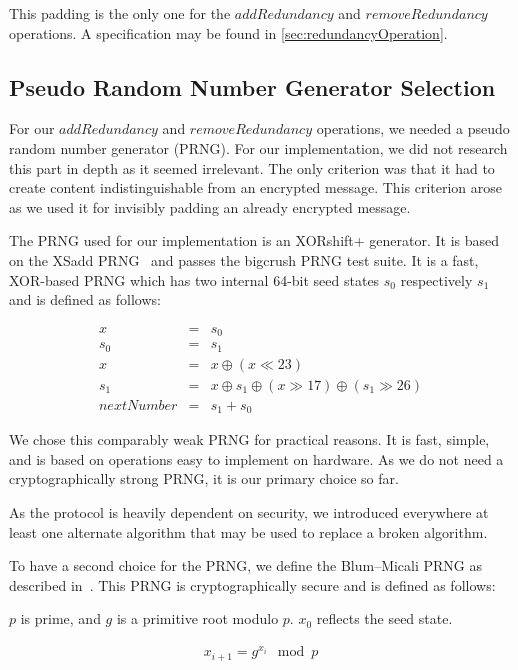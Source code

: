 This padding is the only one for the $addRedundancy$ and $removeRedundancy$ operations. A specification may be found in \cref{sec:redundancyOperation}.

\subsection{Pseudo Random Number Generator Selection}\label{sec:prng}
For our $addRedundancy$ and $removeRedundancy$ operations, we needed a pseudo random number generator (PRNG). For our implementation, we did not research this part in depth as it seemed irrelevant. The only criterion was that it had to create content indistinguishable from an encrypted message. This criterion arose as we used it for invisibly padding an already encrypted message.

The PRNG used for our implementation is an XORshift+ generator. It is based on the XSadd PRNG~\cite{marsaglia2003xorshift} and passes the bigcrush PRNG test suite. It is a fast, XOR-based PRNG which has two internal 64-bit seed states $s_0$ respectively $s_1$ and is defined as follows:

\begin{eqnarray}
	x & = & s_0\\
	s_0 & = & s_1\\
	x & = & x \oplus ( x \ll 23 )\\
	s_1 & = & x \oplus s_1 \oplus ( x \gg 17 ) \oplus (s_1 \gg 26 )\\
	nextNumber & = & s_1+s_0
\end{eqnarray}

We chose this comparably weak PRNG for practical reasons. It is fast, simple, and is based on operations easy to implement on hardware. As we do not need a cryptographically strong PRNG, it is our primary choice so far. 

As the protocol is heavily dependent on security, we introduced everywhere at least one alternate algorithm that may be used to replace a broken algorithm. 

To have a second choice for the PRNG, we define the Blum--Micali PRNG as described in~\cite{blum1984generate}. This PRNG is cryptographically secure and is defined as follows:

$p$ is prime, and $g$ is a primitive root modulo $p$. $x_0$ reflects the seed state.

\begin{eqnarray}
	x_{i+1}=g^{x_i}\mod p
\end{eqnarray}

